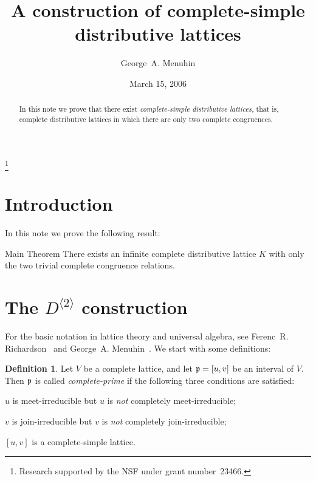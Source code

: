 \documentclass{amsart}
\theoremstyle{plain}
\theoremstyle{definition}
\newtheorem{definition}{Definition}
\theoremstyle{remark}
\numberwithin{equation}{section}
\newcommand{\Dsq}{D^{\langle2\rangle}}
\begin{document}
\title[Complete-simple distributive lattices]
      {A construction of complete-simple\\ 
       distributive lattices}
\author{George~A. Menuhin}
\address{Computer Science Department\\
         University of Winnebago\\
         Winnebago, Minnesota 23714} 
\thanks{Research supported by the NSF under grant number~23466.} 
\date{March 15, 2006}

\begin{abstract}
   In this note we prove that there exist \emph{complete-simple 
   distributive lattices,} that is, complete distributive 
   lattices in which there are only two complete congruences. 
\end{abstract}
\maketitle

\section{Introduction}\label{S:intro} 
In this note we prove the following result:

\begin{named}{Main Theorem}
   There exists an infinite complete distributive lattice 
   $K$ with only the two trivial complete congruence relations. 
\end{named}

\section{The $\Dsq$ construction}\label{S:Ds}  
For the basic notation in lattice theory and universal algebra, 
see Ferenc~R. Richardson~\cite{fR82} and George~A. 
Menuhin~\cite{gM68}. We start with some definitions:

\begin{definition}\label{D:prime}
   Let $V$ be a complete lattice, and let $\mathfrak{p} = [u, v]$ be
   an interval of $V$. Then $\mathfrak{p}$ is called 
   \emph{complete-prime} if the following three conditions 
   are satisfied:
   \begin{enumeratei}
      \item $u$ is meet-irreducible but $u$ is \emph{not}
         completely meet-irreducible;\label{m-i}
      \item $v$ is join-irreducible but $v$ is \emph{not} 
         completely join-irreducible;\label{j-i}
      \item $[u, v]$ is a complete-simple lattice.\label{c-s}
   \end{enumeratei}
\end{definition}
\end{document}

